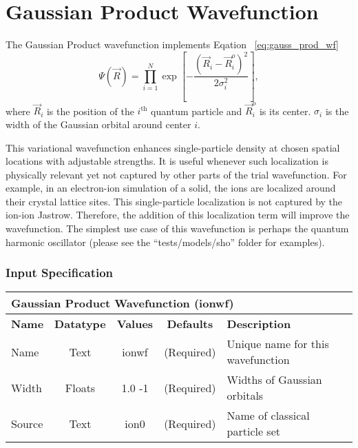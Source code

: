 \section{Gaussian Product Wavefunction}
\label{sec:ionwf}

The Gaussian Product wavefunction implements Eqation ~\ref{eq:gauss_prod_wf}
\begin{equation}
\Psi(\vec{R}) = \prod_{i=1}^N \exp\left[ -\frac{(\vec{R}_i-\vec{R}_i^o)^2}{2\sigma_i^2} \right]
\label{eq:gauss_prod_wf},
\end{equation}
where $\vec{R}_i$ is the position of the $i^{\text{th}}$ quantum particle and $\vec{R}_i^o$ is its center. $\sigma_i$ is the width of the Gaussian orbital around center $i$.

This variational wavefunction enhances single-particle density at chosen spatial locations with adjustable strengths. It is useful whenever such localization is physically relevant yet not captured by other parts of the trial wavefunction. For example, in an electron-ion simulation of a solid, the ions are localized around their crystal lattice sites. This single-particle localization is not captured by the ion-ion Jastrow. Therefore, the addition of this localization term will improve the wavefunction. The simplest use case of this wavefunction is perhaps the quantum harmonic oscillator (please see the ``tests/models/sho'' folder for examples).

\subsubsection{Input Specification}

\begin{table}[h]
\begin{center}
\begin{tabular}{l c c c l }
\hline
\multicolumn{5}{l}{Gaussian Product Wavefunction (ionwf)} \\
\hline
\bfseries Name & \bfseries Datatype & \bfseries Values & \bfseries Defaults  & \bfseries Description \\
\hline
Name & Text & ionwf & (Required) & Unique name for this wavefunction \\
Width & Floats & 1.0 -1 & (Required) & Widths of Gaussian orbitals\\ 
Source & Text & ion0 & (Required) & Name of classical particle set\\ 
\hline
\end{tabular}
\end{center}
\end{table}

